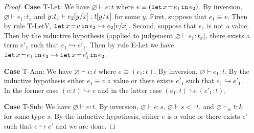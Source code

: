 \documentclass[11pt]{article}
\newcommand{\bind}{\hspace{0.05em}{:}\hspace{0.05em}} %
\newcommand{\col}{\mathbin{:}}       %
\newcommand{\step}{\hookrightarrow}
\newcommand{\letin}[3]{{\tt let}\,#1\hspace{0.1em}{=}\hspace{0.1em}#2\,{\tt in}\,#3}
\begin{document}
\begin{proof}
{\bf Case} {\sc T-Let}: We have $\varnothing \vdash e : t$ where
$e \equiv (\letin{x}{e_1}{e_2})$. By inversion, $\varnothing \vdash e_1:t_x$ and $y\bind t_x\vdash e_2[y/x] : t[y/x]$ for some $y$. First, suppose that $e_1 \equiv v$. Then by rule {\sc T-LetV}, $\letin{x}{v}{e_2} \step e_2[v/x]$. Second, suppose that $e_1$ is not a value. Then by the inductive hypothesis (applied to judgement $\varnothing \vdash e_1:t_x$), there exists a term $e'_1$ such that $e_1 \step e'_1$. Then by rule {\sc E-Let} we have $\letin{x}{e_1}{e_2} \step \letin{x}{e'_1}{e_2}$.

{\bf Case} {\sc T-Ann}: We have $\varnothing \vdash e : t$ where $e \equiv (e_1\col t)$. By inversion, $\varnothing \vdash e_1 : t$. By the inductive hypothesis either $e_1 \equiv v$ a value or there exists $e'_1$ such that $e_1 \hookrightarrow e'_1$. In the former case $(v\col t) \hookrightarrow v$ and in the latter case $(e_1\col t) \hookrightarrow (e'_1\col t)$.

{\bf Case} {\sc T-Sub}: We have $\varnothing \vdash e : t$. By inversion, $\varnothing \vdash e : s$, $\varnothing \vdash s <: t$, and $\varnothing \vdash_w t : k$ for some type $s$. By the inductive hypothesis, either $e$ is a value or there exists $e'$ such that $e \hookrightarrow e'$ and we are done.
\end{proof}
\end{document}
